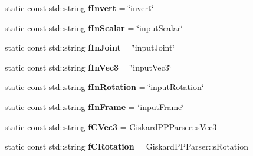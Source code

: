 \begin{DoxyCompactItemize}
\item 
\hypertarget{classgiskard__suturo_1_1AdvancedScope_a184e75e674ae425e6960f0782a0ec521}{static const std\-::string {\bfseries f\-Invert} = \char`\"{}invert\char`\"{}}\label{classgiskard__suturo_1_1AdvancedScope_a184e75e674ae425e6960f0782a0ec521}

\item 
\hypertarget{classgiskard__suturo_1_1AdvancedScope_a3c935d0795ddbd53815578743bae76ff}{static const std\-::string {\bfseries f\-In\-Scalar} = \char`\"{}input\-Scalar\char`\"{}}\label{classgiskard__suturo_1_1AdvancedScope_a3c935d0795ddbd53815578743bae76ff}

\item 
\hypertarget{classgiskard__suturo_1_1AdvancedScope_a9422f2a3ced8d5b26cbe9b8bbbd23188}{static const std\-::string {\bfseries f\-In\-Joint} = \char`\"{}input\-Joint\char`\"{}}\label{classgiskard__suturo_1_1AdvancedScope_a9422f2a3ced8d5b26cbe9b8bbbd23188}

\item 
\hypertarget{classgiskard__suturo_1_1AdvancedScope_ab402ad810b3f7fca305851fab396cb16}{static const std\-::string {\bfseries f\-In\-Vec3} = \char`\"{}input\-Vec3\char`\"{}}\label{classgiskard__suturo_1_1AdvancedScope_ab402ad810b3f7fca305851fab396cb16}

\item 
\hypertarget{classgiskard__suturo_1_1AdvancedScope_adde25528eee6dc5a1c61a36a5e713d76}{static const std\-::string {\bfseries f\-In\-Rotation} = \char`\"{}input\-Rotation\char`\"{}}\label{classgiskard__suturo_1_1AdvancedScope_adde25528eee6dc5a1c61a36a5e713d76}

\item 
\hypertarget{classgiskard__suturo_1_1AdvancedScope_a66d281a35eb22330caaaac0ca9d1e4d8}{static const std\-::string {\bfseries f\-In\-Frame} = \char`\"{}input\-Frame\char`\"{}}\label{classgiskard__suturo_1_1AdvancedScope_a66d281a35eb22330caaaac0ca9d1e4d8}

\item 
\hypertarget{classgiskard__suturo_1_1AdvancedScope_ad5bb37db8e30289c3c35b8745e00912a}{static const std\-::string {\bfseries f\-C\-Vec3} = Giskard\-P\-P\-Parser\-::s\-Vec3}\label{classgiskard__suturo_1_1AdvancedScope_ad5bb37db8e30289c3c35b8745e00912a}

\item 
\hypertarget{classgiskard__suturo_1_1AdvancedScope_a47a64840e1430d0a7268eac235b2b32d}{static const std\-::string {\bfseries f\-C\-Rotation} = Giskard\-P\-P\-Parser\-::s\-Rotation}\label{classgiskard__suturo_1_1AdvancedScope_a47a64840e1430d0a7268eac235b2b32d}


\end{DoxyCompactItemize}
